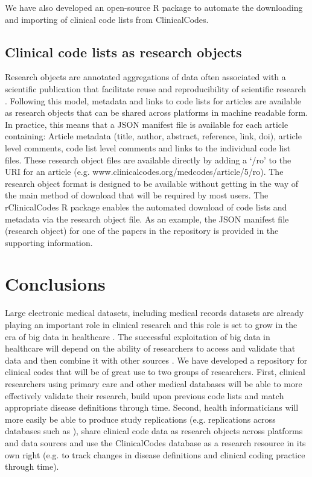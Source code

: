 \documentclass[10pt]{article}
\begin{document}
We have also developed an open-source R package \cite{Springate2014} to automate the downloading and importing of clinical code lists from ClinicalCodes.


\subsection*{Clinical code lists as research objects}


Research objects are annotated aggregations of data often associated with a scientific publication that facilitate reuse and reproducibility of scientific research \cite{Bechhofer2010}. Following this model, metadata and links to code lists for articles are available as research objects that can be shared across platforms in machine readable form.  In practice, this means that a JSON manifest file is available for each article containing: Article metadata (title, author, abstract, reference, link, doi), article level comments, code list level comments and links to the individual code list files. These research object files are available directly by adding a `/ro' to the URI for an article (e.g. www.clinicalcodes.org/medcodes/article/5/ro).  The research object format is designed to be available without getting in the way of the main method of download that will be required by most users.  The rClinicalCodes R package \cite{Springate2014} enables the automated download of code lists and metadata via the research object file. As an example, the JSON manifest file (research object) for one of the papers in the repository \cite{Kontopantelis2014} is provided in the supporting information.

\section*{Conclusions}


Large electronic medical datasets, including medical records datasets are already playing an important role in clinical research and this role is set to grow in the era of big data in healthcare \cite{Wang2013}. The successful exploitation of big data in healthcare will depend on the ability of researchers to access and validate that data and then combine it with other sources \cite{Murdoch2013}.  We have developed a repository for clinical codes that will be of great use to two groups of researchers.  First, clinical researchers using primary care and other medical databases will be able to more effectively validate their research, build upon previous code lists and match appropriate disease definitions through time. Second, health informaticians will more easily be able to produce study replications (e.g. replications across databases such as \cite{Reeves2014}), share clinical code data as research objects across platforms and data sources and use the ClinicalCodes database as a research resource in its own right (e.g. to track changes in disease definitions and clinical coding practice through time).
\end{document}
